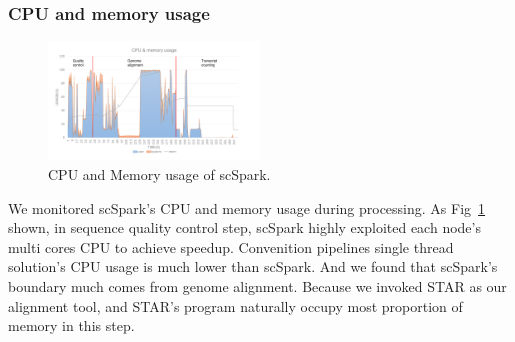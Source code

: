 \documentclass[conference]{IEEEtran}
\begin{document}
  \subsubsection{CPU and memory usage}
  \begin{figure}
    \includegraphics[width=0.5\textwidth]{fig8.pdf}
    \caption{CPU and Memory usage of scSpark.} \label{fig8}
  \end{figure}
  We monitored scSpark's CPU and memory usage during processing. 
  As Fig~\ref{fig8} shown, in sequence quality control step, scSpark highly exploited each node's multi cores CPU to achieve speedup. 
  Convenition pipelines single thread solution's CPU usage is much lower than scSpark. 
  And we found that scSpark's boundary much comes from genome alignment.
  Because we invoked STAR as our alignment tool, and STAR's program naturally occupy most proportion of memory in this step.
  
\end{document}
